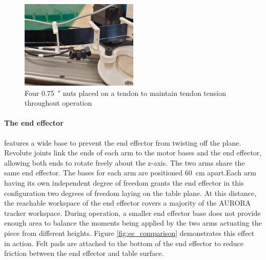 \begin{figure}[h]
    \centering
    \includegraphics[width=0.5\textwidth]{images/tendon_slack.jpg}
    \caption{Four \SI{0.75}{"} nuts placed on a tendon to maintain tendon tension throughout operation}
    \label{fig:tendon_slack}
\end{figure}


\paragraph{The end effector} features a wide base to prevent the end effector from twisting off the plane. Revolute joints link the ends of each arm to the motor bases and the end effector, allowing both ends to rotate freely about the z-axis. The two arms share the same end effector. The bases for each arm are positioned \SI{60}{cm} apart.Each arm having its own independent degree of freedom grants the end effector in this configuration two degrees of freedom laying on the table plane. At this distance, the reachable workspace of the end effector covers a majority of the AURORA tracker workspace. During operation, a smaller end effector base does not provide enough area to balance the moments being applied by the two arms actuating the piece from different heights. Figure \ref{fig:ee_comparison} demonstrates this effect in action. Felt pads are attached to the bottom of the end effector to reduce friction between the end effector and table surface. 

